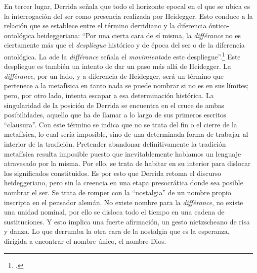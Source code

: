 \documentclass{book}
\begin{document}
En tercer lugar, Derrida señala que todo el horizonte epocal en el que
se ubica es la interrogación del ser como presencia realizada por
Heidegger. Esto conduce a la relación que se establece entre el término
derridiano y la diferencia óntico-ontológica heideggeriana: \enquote{Por una
cierta cara de sí misma, la \emph{différance} no es ciertamente más que
el \emph{despliegue} histórico y de época del ser o de la diferencia
ontológica. La \emph{a}de la \emph{différance} señala el
\emph{movimiento}de este despliegue}.\footcites[23]{derrida1989a}[La
  diferencia ontológica sería, así, derivada: \enquote{(\dots) ente y ser,
  óntico y ontológico, ``óntico-ontológico'' serían, en
  un~estilo\emph{~}original,~\emph{derivados~}respecto de la diferencia;
  y en relación con lo que. más adelante denominaremos
  la~\emph{différance}, concepto económico que designa la producción del
  diferir, en el doble sentido de esta palabra La diferencia
  óntico-ontológica y su fundamento (\emph{Grund}) en la ``trascendencia
  del Dasein''{[}\emph{Vom Wesen des Grundes}, p. 16{]}\emph{~}no serían
  absolutamente originarios. La différance sería más ``originaria'',
  pero no podría denominársela ya ``origen'' ni ``fundamento'', puesto
  que estas nociones pertenecen esencialmente a la historia de la
  onto-teología, es decir al sistema que funciona como borradura de la
  diferencia}.][32]{derrida1989a} Este despliegue es también un intento de dar
un paso más allá de Heidegger. La \emph{différance}, por un lado, y a
diferencia de Heidegger, será un término que pertenece a la metafísica
en tanto nada se puede nombrar si no es en sus límites; pero, por otro
lado, intenta escapar a esa determinación histórica. La singularidad de
la posición de Derrida se encuentra en el cruce de ambas posibilidades,
aquello que ha de llamar a lo largo de sus primeros escritos \enquote{clausura}.
Con este término se indica que no se trata del fin o el cierre de la
metafísica, lo cual sería imposible, sino de una determinada forma de
trabajar al interior de la tradición. Pretender abandonar
definitivamente la tradición metafísica resulta imposible puesto que
inevitablemente hablamos un lenguaje atravesado por la misma. Por ello,
se trata de habitar en su interior para dislocar los significados
constituidos. Es por esto que Derrida retoma el discurso heideggeriano,
pero sin la creencia en una etapa presocrática donde sea posible nombrar
el ser. Se trata de romper con la \enquote{nostalgia} de un nombre propio
inscripta en el pensador alemán. No existe nombre para la
\emph{différance}, no existe una unidad nominal, por ello se disloca
todo el tiempo en una cadena de sustituciones. Y esto implica una fuerte
afirmación, un gesto nietzscheano de risa y danza. Lo que derrumba la
otra cara de la nostalgia que es la esperanza, dirigida a encontrar el
nombre único, el nombre-Dios.
\end{document}
